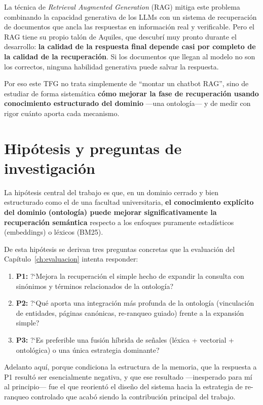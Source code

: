 \documentclass[12pt, a4paper, twoside]{report}
\begin{document}
La t\'ecnica de \textit{Retrieval Augmented Generation} (RAG) mitiga este problema combinando la capacidad generativa de los LLMs con un sistema de recuperaci\'on de documentos que ancla las respuestas en informaci\'on real y verificable. Pero el RAG tiene su propio tal\'on de Aquiles, que descubr\'i muy pronto durante el desarrollo: \textbf{la calidad de la respuesta final depende casi por completo de la calidad de la recuperaci\'on}. Si los documentos que llegan al modelo no son los correctos, ninguna habilidad generativa puede salvar la respuesta.

Por eso este TFG no trata simplemente de ``montar un chatbot RAG'', sino de estudiar de forma sistem\'atica \textbf{c\'omo mejorar la fase de recuperaci\'on usando conocimiento estructurado del dominio} ---una ontolog\'ia--- y de medir con rigor cu\'anto aporta cada mecanismo.

\section{Hip\'otesis y preguntas de investigaci\'on}

La hip\'otesis central del trabajo es que, en un dominio cerrado y bien estructurado como el de una facultad universitaria, \textbf{el conocimiento expl\'icito del dominio (ontolog\'ia) puede mejorar significativamente la recuperaci\'on sem\'antica} respecto a los enfoques puramente estad\'isticos (embeddings) o l\'exicos (BM25).

De esta hip\'otesis se derivan tres preguntas concretas que la evaluaci\'on del Cap\'itulo~\ref{ch:evaluacion} intenta responder:

\begin{enumerate}
  \item \textbf{P1:} ?`Mejora la recuperaci\'on el simple hecho de expandir la consulta con sin\'onimos y t\'erminos relacionados de la ontolog\'ia?
  \item \textbf{P2:} ?`Qu\'e aporta una integraci\'on m\'as profunda de la ontolog\'ia (vinculaci\'on de entidades, p\'aginas can\'onicas, re-ranqueo guiado) frente a la expansi\'on simple?
  \item \textbf{P3:} ?`Es preferible una fusi\'on h\'ibrida de se\~nales (l\'exica + vectorial + ontol\'ogica) o una \'unica estrategia dominante?
\end{enumerate}

Adelanto aqu\'i, porque condiciona la estructura de la memoria, que la respuesta a P1 result\'o ser esencialmente negativa, y que ese resultado ---inesperado para m\'i al principio--- fue el que reorient\'o el dise\~no del sistema hacia la estrategia de re-ranqueo controlado que acab\'o siendo la contribuci\'on principal del trabajo.
\end{document}
